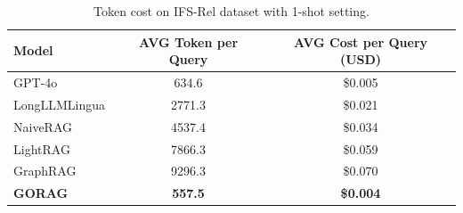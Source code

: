 \begin{table}[t]
	\centering
	\caption{Token cost on IFS-Rel dataset with 1-shot setting.}
	\label{tab:gorag:token}
	
	\small
		\begin{tabular}{l|c|c} 
			\hline\hline
			\textbf{Model} & \textbf{AVG Token per Query} & \textbf{AVG Cost per Query (USD)}  \\ 
			\hline
			GPT-4o         & 634.6                        & \$0.005                               \\
			LongLLMLingua  & 2771.3                       & \$0.021                               \\
			NaiveRAG       & 4537.4                       & \$0.034                               \\
			LightRAG       & 7866.3                       & \$0.059                               \\
			GraphRAG       & 9296.3                       & \$0.070                               \\
			\textbf{GORAG} & \textbf{557.5}               & \textbf{\$0.004}                      \\
			\hline\hline
		\end{tabular}
	
\end{table}
